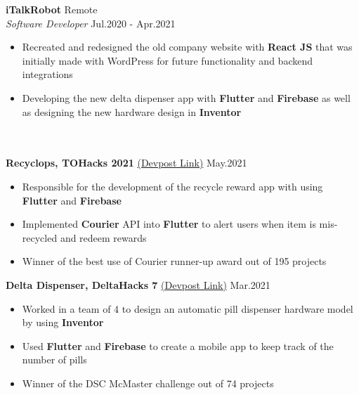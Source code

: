 \documentclass[a4paper]{article}
\newcommand{\lineunder} {
    \vspace*{-8pt} \\
    \hspace*{-18pt} \hrulefill \\
}
\newcommand{\header} [1] {
    {\hspace*{-18pt}\vspace*{6pt} \textsc{#1}}
    \vspace*{-6pt} \lineunder
}
\begin{document}
\vspace{-1mm}

\textbf{iTalkRobot} \hfill Remote\\
\textit{Software Developer} \hfill Jul.2020 - Apr.2021\\
\vspace{-2mm}
\begin{itemize} \itemsep -2pt
	\item{Recreated and redesigned the old company website with \textbf{React JS} that was initially made with WordPress for future functionality and backend integrations}
	\item{Developing the new delta dispenser app with \textbf{Flutter} and \textbf{Firebase} as well as designing the new hardware design in \textbf{Inventor}}
\end{itemize}


\header{\textbf{}}
\vspace{1mm}
{\textbf{Recyclops, TOHacks 2021}} \href{https://devpost.com/software/recyclops-lxghf8}{(Devpost Link)}
\hfill{May.2021}\\

\vspace{-2mm}
 \begin{itemize} \itemsep -2pt
    \item{Responsible for the development of the recycle reward app with using \textbf{Flutter} and \textbf{Firebase}} 
    \item {Implemented \textbf{Courier} API into \textbf{Flutter} to alert users when item is mis-recycled and redeem rewards}
    \item{Winner of the best use of Courier runner-up award out of 195 projects}
\end{itemize}

\vspace*{-1mm}

{\textbf{Delta Dispenser, DeltaHacks 7}} \href{https://devpost.com/software/pill-dispenser-reminder-2000}{(Devpost Link)}
\hfill{Mar.2021}\\
\vspace{-2mm}
 \begin{itemize} \itemsep -2pt
    \item{Worked in a team of 4 to design an automatic pill dispenser hardware model by using \textbf{Inventor}}
    \item{Used \textbf{Flutter} and \textbf{Firebase} to create a mobile app to keep track of the number of pills}
    \item{Winner of the DSC McMaster challenge out of 74 projects}
\end{itemize}
\vspace*{0mm}
\end{document}
